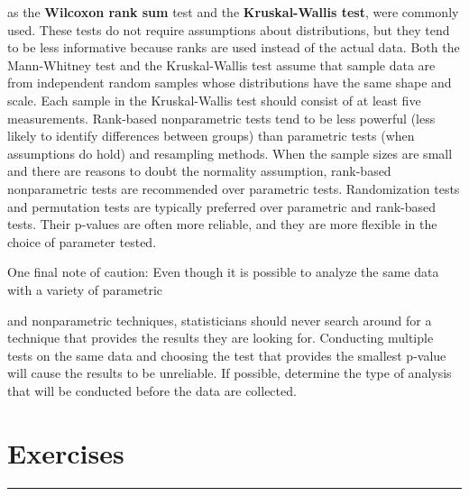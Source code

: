 \documentclass[
]{report}
\theoremstyle{definition}
\theoremstyle{definition}
\theoremstyle{definition}
\theoremstyle{definition}
\theoremstyle{remark}
\begin{document}
as the \textbf{Wilcoxon rank sum} test and the \textbf{Kruskal-Wallis test}, were commonly used. These tests do not
require assumptions about distributions, but they tend to be less informative because ranks are used instead
of the actual data. Both the Mann-Whitney test and the Kruskal-Wallis test assume that sample data are
from independent random samples whose distributions have the same shape and scale. Each sample in the
Kruskal-Wallis test should consist of at least five measurements. Rank-based nonparametric tests tend to be
less powerful (less likely to identify differences between groups) than parametric tests (when assumptions do
hold) and resampling methods. When the sample sizes are small and there are reasons to doubt the normality
assumption, rank-based nonparametric tests are recommended over parametric tests. Randomization tests and
permutation tests are typically preferred over parametric and rank-based tests. Their p-values are often more
reliable, and they are more flexible in the choice of parameter tested.

One final note of caution: Even though it is possible to analyze the same data with a variety of parametric

and nonparametric techniques, statisticians should never search around for a technique that provides the
results they are looking for. Conducting multiple tests on the same data and choosing the test that provides
the smallest p-value will cause the results to be unreliable. If possible, determine the type of analysis that will
be conducted before the data are collected.

\hypertarget{exercises}{%
\section*{\texorpdfstring{\textbf{Exercises}}{Exercises}}\label{exercises}}

\vspace{-2em}

\noindent

\rule{\linewidth}{0.4pt}

\renewcommand{\theexcount}{E\arabic{excount}}
\end{document}

